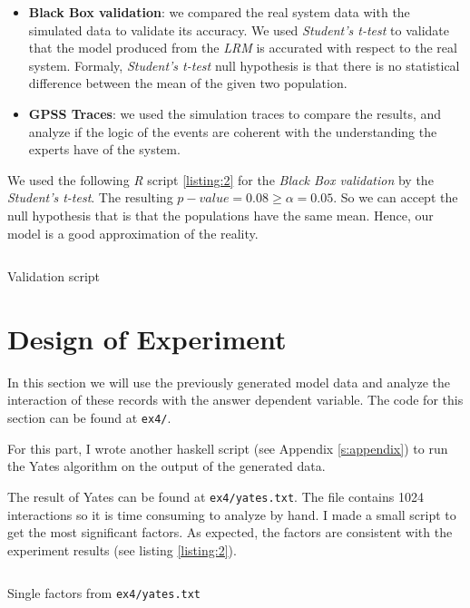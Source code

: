\documentclass[12pt, a4paper]{article} %
\theoremstyle{definition}
\newcommand{\code}[1]{\texttt{#1}} %
\begin{document}
\begin{itemize}
  \item \textbf{Black Box validation}: we compared the real system data with the simulated data to validate its accuracy. We used \textit{Student's t-test} to validate that the model produced from the \textit{LRM} is accurated with respect to the real system. Formaly, \textit{Student's t-test} null hypothesis is that there is no statistical difference between the mean of the given two population.

  \item \textbf{GPSS Traces}: we used the simulation traces to compare the results, and analyze if the logic of the events are coherent with the understanding the experts have of the system. \\
\end{itemize}

We used the following \textit{R} script \ref{listing:2} for the \textit{Black Box validation} by the \textit{Student's t-test}. The resulting $p-value = 0.08 \geq \alpha = 0.05$. So we can accept the null hypothesis that is that the populations have the same mean. Hence, our model is a good approximation of the reality.

\begin{listing}[ht]
  \inputminted[fontsize=\footnotesize]{r}{../ex3/validation.R}
  \caption{Validation script}
\label{listing:2}
\end{listing}


\section{Design of Experiment}

In this section we will use the previously generated model data and analyze the interaction of these records with the answer dependent variable. The code for this section can be found at \code{ex4/}.

For this part, I wrote another haskell script (see Appendix \ref{s:appendix}) to run the Yates algorithm on the output of the generated data.

The result of Yates can be found at \code{ex4/yates.txt}. The file contains 1024 interactions so it is time consuming to analyze by hand. I made a small script to get the most significant factors. As expected, the factors are consistent with the experiment results (see listing \ref{listing:2}).

\begin{listing}[ht]
  \inputminted[fontsize=\footnotesize]{r}{../ex4/yates_single_factor.txt}
  \caption{Single factors from \code{ex4/yates.txt}}
\label{listing:2}
\end{listing}
\end{document}
